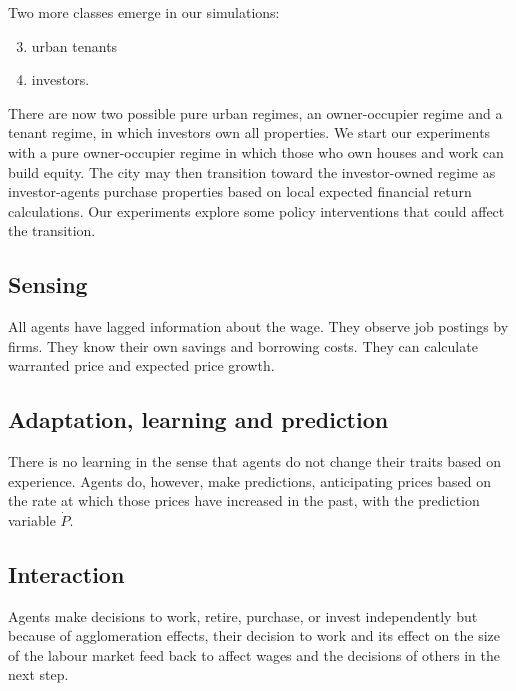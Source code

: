 Two more classes emerge in our simulations:
 \begin{enumerate}    \setcounter{enumi}{2}
    \item urban tenants
    \item investors. 
\end{enumerate}
There are now two possible pure urban regimes, an owner-occupier regime and a tenant regime, in which investors own all properties. We start our experiments with a pure owner-occupier regime in which those who own houses and work can build equity.  The city may then transition toward the investor-owned regime as investor-agents purchase properties based on local expected financial return calculations. Our experiments explore some policy interventions that could affect the transition.






\subsection{Sensing}
All agents have lagged information about the wage. They observe job postings by firms. They know their own savings and borrowing costs. They can calculate  warranted price and expected price growth.%



\subsection{Adaptation, learning and prediction}
There is no learning in the sense that agents do not change their traits based on experience. Agents do, however, make predictions, anticipating prices based on the rate at which those prices have increased in the past, with the prediction variable $\dot P$.

\subsection{Interaction}
Agents make decisions to work, retire,  purchase, or invest independently but because of agglomeration effects, their decision to work and its effect on the size of the labour market feed back to affect wages and the decisions of others in the next step. 

